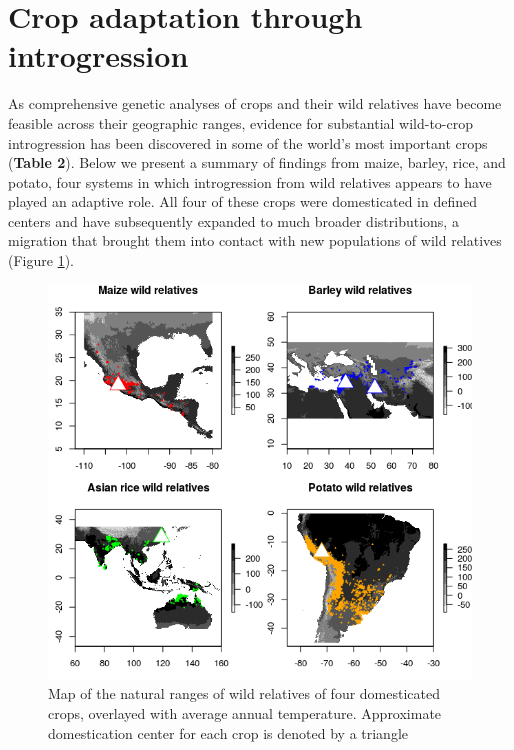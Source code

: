 \documentclass[11pt]{article}
\begin{document}
\section*{Crop adaptation through introgression}

As comprehensive genetic analyses of crops and their wild relatives have become feasible across their geographic ranges, evidence for substantial wild-to-crop introgression has been discovered in some of the world's most important crops (\textbf{Table 2}).
Below we present a summary of findings from maize, barley, rice, and potato, four systems in which introgression from wild relatives appears to have played an adaptive role.
All four of these crops were domesticated in defined centers and have subsequently expanded to much broader distributions, a migration that brought them into contact with new populations of wild relatives (Figure \ref{fig:map}).

\begin{figure}[h]
	\centering
	\includegraphics[width=15cm]{temperature_plot.png}
	\caption{Map of the natural ranges of wild relatives of four domesticated crops, overlayed with average annual temperature. Approximate domestication center for each crop is denoted by a triangle}
	\label{fig:map}
\end{figure}
\end{document}
